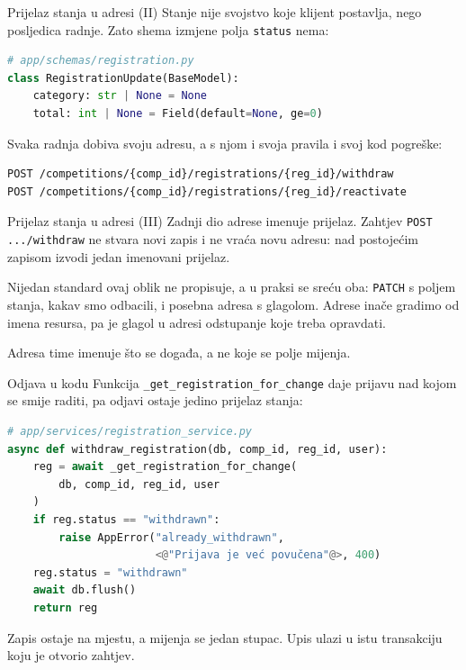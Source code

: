 \begin{frame}[fragile]{Prijelaz stanja u adresi (II)}
Stanje nije svojstvo koje klijent postavlja, nego posljedica radnje. Zato shema izmjene polja \texttt{status} nema:

\begin{lstlisting}[language=python]
# app/schemas/registration.py
class RegistrationUpdate(BaseModel):
    category: str | None = None
    total: int | None = Field(default=None, ge=0)
\end{lstlisting}

\vspace{0.4em}
Svaka radnja dobiva svoju adresu, a s njom i svoja pravila i svoj kod pogreške:

\begin{lstlisting}
POST /competitions/{comp_id}/registrations/{reg_id}/withdraw
POST /competitions/{comp_id}/registrations/{reg_id}/reactivate
\end{lstlisting}
\end{frame}

\begin{frame}{Prijelaz stanja u adresi (III)}
Zadnji dio adrese imenuje prijelaz. Zahtjev \texttt{POST .../withdraw} ne stvara novi zapis i ne vraća novu adresu: nad postojećim zapisom izvodi jedan imenovani prijelaz.

\vspace{0.9em}
\begin{konvencija}
Nijedan standard ovaj oblik ne propisuje, a u praksi se sreću oba: \texttt{PATCH} s poljem stanja, kakav smo odbacili, i posebna adresa s glagolom. Adrese inače gradimo od imena resursa, pa je glagol u adresi odstupanje koje treba opravdati.
\end{konvencija}

\vspace{0.9em}
Adresa time imenuje što se događa, a ne koje se polje mijenja.
\end{frame}

\begin{frame}[fragile]{Odjava u kodu}
Funkcija \texttt{\_get\_registration\_for\_change} daje prijavu nad kojom se smije raditi, pa odjavi ostaje jedino prijelaz stanja:

\begin{lstlisting}[language=python]
# app/services/registration_service.py
async def withdraw_registration(db, comp_id, reg_id, user):
    reg = await _get_registration_for_change(
        db, comp_id, reg_id, user
    )
    if reg.status == "withdrawn":
        raise AppError("already_withdrawn",
                       <@"Prijava je već povučena"@>, 400)
    reg.status = "withdrawn"
    await db.flush()
    return reg
\end{lstlisting}

\vspace{0.3em}
Zapis ostaje na mjestu, a mijenja se jedan stupac. Upis ulazi u istu transakciju koju je otvorio zahtjev.
\end{frame}

